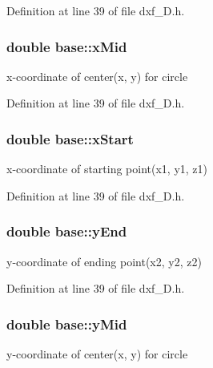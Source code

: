 Definition at line 39 of file dxf\-\_\-D.\-h.

\hypertarget{classbase_a83f02880ca88c37fcb28acced4d6b9a7}{
\subsubsection[{x\-Mid}]{\setlength{\rightskip}{0pt plus 5cm}double base\-::x\-Mid\hspace{0.3cm}{\ttfamily [protected]}}}\label{classbase_a83f02880ca88c37fcb28acced4d6b9a7}
x-\/coordinate of center(x, y) for circle 

Definition at line 39 of file dxf\-\_\-D.\-h.

\hypertarget{classbase_a7703056e2be3f7e97f974e77146c3a02}{
\subsubsection[{x\-Start}]{\setlength{\rightskip}{0pt plus 5cm}double base\-::x\-Start\hspace{0.3cm}{\ttfamily [protected]}}}\label{classbase_a7703056e2be3f7e97f974e77146c3a02}
x-\/coordinate of starting point(x1, y1, z1) 

Definition at line 39 of file dxf\-\_\-D.\-h.

\hypertarget{classbase_aa5a4fed2eaf64367a8ef693d8d054081}{
\subsubsection[{y\-End}]{\setlength{\rightskip}{0pt plus 5cm}double base\-::y\-End\hspace{0.3cm}{\ttfamily [protected]}}}\label{classbase_aa5a4fed2eaf64367a8ef693d8d054081}
y-\/coordinate of ending point(x2, y2, z2) 

Definition at line 39 of file dxf\-\_\-D.\-h.

\hypertarget{classbase_acb79a7b7e25b442e350a151626f8aa46}{
\subsubsection[{y\-Mid}]{\setlength{\rightskip}{0pt plus 5cm}double base\-::y\-Mid\hspace{0.3cm}{\ttfamily [protected]}}}\label{classbase_acb79a7b7e25b442e350a151626f8aa46}
y-\/coordinate of center(x, y) for circle 

